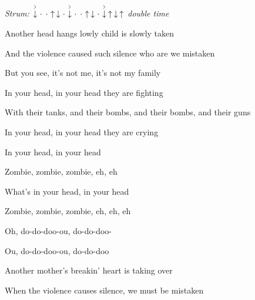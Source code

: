 \begin{song}


\begin{headerbox}
\RaiseBoxWithAccents
\textit{Strum:} $\AccentDown\Miss\Miss\Up \Down\Miss\AccentDown\Miss \Miss\Up\Down\Miss \AccentDown\Up\Down\Up$ \textit{double time}
\end{headerbox}

\begin{hchordbox}
\end{hchordbox}

\Large

\bigskip

 Another head hangs lowly child is slowly taken \par
{} And the violence caused such silence who are we mistaken \par

\bigskip

But you see, it’s not me, it’s not my family \par
In your head, in your head they are fighting \par
With their tanks, and their bombs, and their bombs, and their guns \par
In your head, in your head they are crying \par

\bigskip

In your head, in your head \par
Zombie, zombie, zombie, eh, eh \par
What’s in your head, in your head \par
Zombie, zombie, zombie, eh, eh, eh \par
{}Oh, do-do-doo-ou, do-do-doo- \par
{}Ou, do-do-doo-ou, do-do-doo  \par
 
\bigskip

 Another mother’s breakin’ heart is taking over \par
{} When the violence causes silence, we must be mistaken \par

\bigskip


\end{song}
